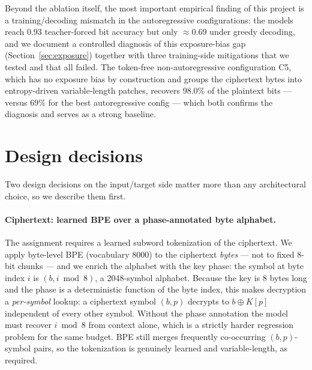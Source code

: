 \documentclass[11pt]{article}
\begin{document}
Beyond the ablation itself, the most important empirical finding of this project
is a training/decoding mismatch in the autoregressive configurations: the models
reach 0.93 teacher-forced bit accuracy but only $\approx$0.69 under greedy
decoding, and we document a controlled diagnosis of this exposure-bias gap
(Section~\ref{sec:exposure}) together with three training-side mitigations that we
tested and that all failed. The token-free non-autoregressive configuration C5,
which has no exposure bias by construction and groups the ciphertext bytes into
entropy-driven variable-length patches, recovers 98.0\% of the plaintext bits ---
versus 69\% for the best autoregressive config --- which both confirms the
diagnosis and serves as a strong baseline. %

\section{Design decisions}
\label{sec:design}
Two design decisions on the input/target side matter more than any architectural
choice, so we describe them first.

\paragraph{Ciphertext: learned BPE over a phase-annotated byte alphabet.}
The assignment requires a learned subword tokenization of the ciphertext. We apply
byte-level BPE (vocabulary 8000) to the ciphertext \emph{bytes} --- not to fixed
8-bit chunks --- and we enrich the alphabet with the key phase: the symbol at
byte index $i$ is $(b, i \bmod 8)$, a 2048-symbol alphabet. Because the key is
8 bytes long and the phase is a deterministic function of the byte index, this
makes decryption a \emph{per-symbol} lookup: a ciphertext symbol $(b,p)$ decrypts
to $b \oplus K[p]$ independent of every other symbol. Without the phase
annotation the model must recover $i \bmod 8$ from context alone, which is a
strictly harder regression problem for the same budget. BPE still merges
frequently co-occurring $(b,p)$-symbol pairs, so the tokenization is genuinely
learned and variable-length, as required.
\end{document}
